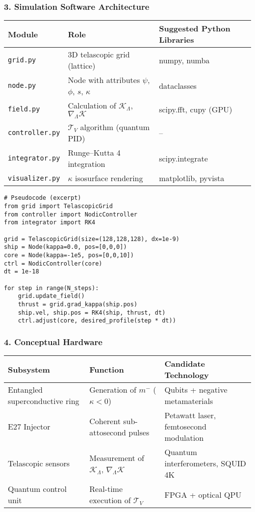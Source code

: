 \documentclass[12pt]{article}
\begin{document}
\subsubsection*{3. Simulation Software Architecture}
\begin{table}[H]
\centering
\begin{tabular}{lll}
\toprule
\textbf{Module} & \textbf{Role} & \textbf{Suggested Python Libraries} \\
\midrule
\texttt{grid.py} & 3D telascopic grid (lattice) & numpy, numba \\
\texttt{node.py} & Node with attributes $\psi$, $\phi$, $s$, $\kappa$ & dataclasses \\
\texttt{field.py} & Calculation of $\mathcal{K}_\Lambda$, $\nabla_\Lambda \mathcal{K}$ & scipy.fft, cupy (GPU) \\
\texttt{controller.py} & $\mathcal{T}_V$ algorithm (quantum PID) & -- \\
\texttt{integrator.py} & Runge–Kutta 4 integration & scipy.integrate \\
\texttt{visualizer.py} & $\kappa$ isosurface rendering & matplotlib, pyvista \\
\bottomrule
\end{tabular}
\end{table}

\begin{verbatim}
# Pseudocode (excerpt)
from grid import TelascopicGrid
from controller import NodicController
from integrator import RK4

grid = TelascopicGrid(size=(128,128,128), dx=1e-9)
ship = Node(kappa=0.0, pos=[0,0,0])
core = Node(kappa=-1e5, pos=[0,0,10])
ctrl = NodicController(core)
dt = 1e-18

for step in range(N_steps):
    grid.update_field()
    thrust = grid.grad_kappa(ship.pos)
    ship.vel, ship.pos = RK4(ship, thrust, dt)
    ctrl.adjust(core, desired_profile(step * dt))
\end{verbatim}

\subsubsection*{4. Conceptual Hardware}
\begin{table}[H]
\centering
\begin{tabular}{lll}
\toprule
\textbf{Subsystem} & \textbf{Function} & \textbf{Candidate Technology} \\
\midrule
Entangled superconductive ring & Generation of $m^-$ ($\kappa < 0$) & Qubits + negative metamaterials \\
E27 Injector & Coherent sub-attosecond pulses & Petawatt laser, femtosecond modulation \\
Telascopic sensors & Measurement of $\mathcal{K}_\Lambda$, $\nabla_\Lambda \mathcal{K}$ & Quantum interferometers, SQUID 4K \\
Quantum control unit & Real-time execution of $\mathcal{T}_V$ & FPGA + optical QPU \\
\bottomrule
\end{tabular}
\end{table}
\end{document}
